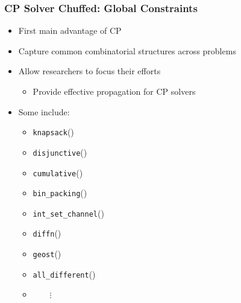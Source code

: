 \documentclass{beamer}
\begin{document}
\begin{frame}
\frametitle{CP Solver Chuffed: Global Constraints}

\begin{itemize}
	\item First main advantage of CP
	\item Capture common combinatorial structures across problems\vspace{1mm}
	\item Allow researchers to focus their efforts\vspace{2mm}
	\begin{itemize}
		\item Provide effective propagation for CP solvers\pause
	\end{itemize}
	\item Some include:\vspace{2mm}
	\begin{itemize}
		\item {\tt knapsack}()\vspace{1mm}
		\item {\tt disjunctive}()\vspace{1mm}
		\item {\tt cumulative}()\vspace{1mm}
		\item {\tt bin\_packing}()\vspace{1mm}
		\item \small{\tt int\_set\_channel}()\vspace{1.5mm}
		\item \footnotesize{\tt diffn}()\vspace{1mm}
		\item \scriptsize{\tt geost}()\vspace{2mm}
		\item \tiny{\tt all\_different}()\vspace{1mm}
		\item $\qquad\vdots$
	\end{itemize}
\end{itemize}
\end{frame}
\end{document}
